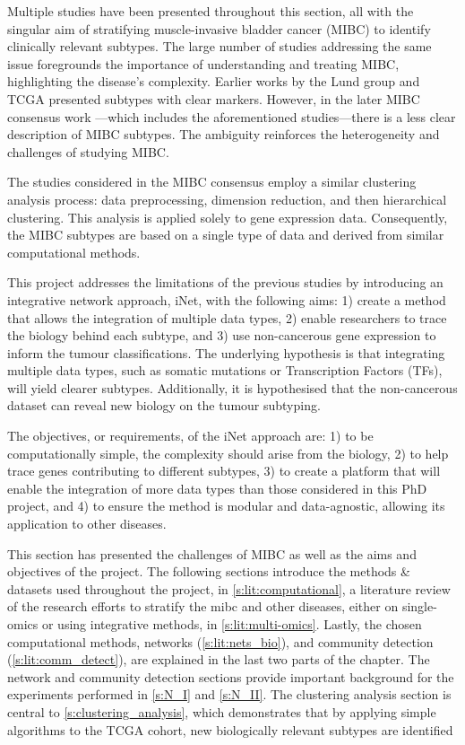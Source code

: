 Multiple studies have been presented throughout this section, all with the singular aim of stratifying muscle-invasive bladder cancer (MIBC) to identify clinically relevant subtypes. The large number of studies addressing the same issue foregrounds the importance of understanding and treating MIBC, highlighting the disease's complexity. Earlier works by the Lund group \cite{Sjodahl2017-xr, Marzouka2018-ge} and TCGA \cite{Tcga2014-dr, Robertson2017-mg} presented subtypes with clear markers. However, in the later MIBC consensus work \cite{Kamoun2020-tj}—which includes the aforementioned studies—there is a less clear description of MIBC subtypes. The ambiguity reinforces the heterogeneity and challenges of studying MIBC.

The studies considered in the MIBC consensus employ a similar clustering analysis process: data preprocessing, dimension reduction, and then hierarchical clustering. This analysis is applied solely to gene expression data. Consequently, the MIBC subtypes are based on a single type of data and derived from similar computational methods.

This project addresses the limitations of the previous studies by introducing an integrative network approach, iNet, with the following aims: 1) create a method that allows the integration of multiple data types, 2) enable researchers to trace the biology behind each subtype, and 3) use non-cancerous gene expression to inform the tumour classifications. The underlying hypothesis is that integrating multiple data types, such as somatic mutations or Transcription Factors (TFs), will yield clearer subtypes. Additionally, it is hypothesised that the non-cancerous dataset can reveal new biology on the tumour subtyping.

The objectives, or requirements, of the iNet approach are: 1) to be computationally simple, the complexity should arise from the biology, 2) to help trace genes contributing to different subtypes, 3) to create a platform that will enable the integration of more data types than those considered in this PhD project, and 4) to ensure the method is modular and data-agnostic, allowing its application to other diseases.


This section has presented the challenges of MIBC as well as the aims and objectives of the project. The following sections introduce the methods \& datasets used throughout the project, in \cref{s:lit:computational}, a literature review of the research efforts to stratify the \acrshort{mibc} and other diseases, either on single-omics or using integrative methods, in \cref{s:lit:multi-omics}. Lastly, the chosen computational methods, networks (\cref{s:lit:nets_bio}), and community detection (\cref{s:lit:comm_detect}), are explained in the last two parts of the chapter. The network and community detection sections provide important background for the experiments performed in \cref{s:N_I} and \cref{s:N_II}. The clustering analysis section is central to \cref{s:clustering_analysis}, which demonstrates that by applying simple algorithms to the TCGA cohort, new biologically relevant subtypes are identified